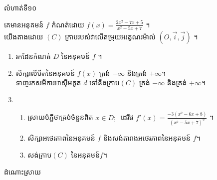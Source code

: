 \documentclass[expologarit]{subfiles}
\begin{document}
 \begin{center}
\color{violet} \kml លំហាត់ទី១០
 \end{center}
គេមានអនុគមន៍ $f$ កំណត់ដោយ $f(x)=\frac{2x^2-7x+5}{x^2-5x+7}$ ។\\ យើងតាងដោយ $(C)$ ក្រាបរបស់វាលើតម្រុយអរតូណរម៉ាល់ $\left(O,\overrightarrow{i},\overrightarrow{j}\right)$ ។
\begin{enumerate}
\item រកដែនកំណត់ $D$ នៃអនុគមន៍ $f$ ។
\item សិក្សាលីមីតនៃអនុគមន៍ $f(x)$ ត្រង់ $-\infty$ និងត្រង់ $+\infty$។\\ ទាញរកសមីការអាស៊ីមតូត $d$ ទៅនឹងក្រាប$(C)$ ត្រង់ $-\infty$ និងត្រង់ $+\infty$។
\item \begin{enumerate}[a]
\item ស្រាយបំភ្លឺថាគ្រប់ចំនួនពិត $x\in D;\ $ ដេរីវេ $f'(x)=\frac{-3\left(x^2-6x+8\right)}{\left(x^2-5x+7\right)^2}$ ។
\item សិក្សាអថេរភាពនៃអនុគមន៍ $f$ និងសង់តារាងអថេរភាពនៃអនុគមន៍ $f$។
\item សង់ក្រាប$(C)$ នៃអនុគមន៍$f $។
\end{enumerate}
\end{enumerate}
\begin{center}
\color{violet}\kml ដំណោះស្រាយ
\end{center}
\end{document}
